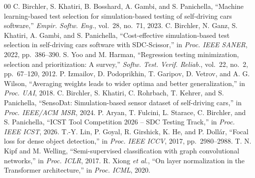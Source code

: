 \documentclass[conference]{IEEEtran}
\begin{document}
{\small
\vspace{-5pt}
\begin{thebibliography}{00}
 C. Birchler, S. Khatiri, B. Bosshard, A. Gambi, and S. Panichella, ``Machine learning-based test selection for simulation-based testing of self-driving cars software,'' \textit{Empir. Softw. Eng.}, vol.~28, no.~71, 2023.
 C. Birchler, N. Ganz, S. Khatiri, A. Gambi, and S. Panichella, ``Cost-effective simulation-based test selection in self-driving cars software with SDC-Scissor,'' in \textit{Proc. IEEE SANER}, 2022, pp.~386--390.
 S. Yoo and M. Harman, ``Regression testing minimization, selection and prioritization: A survey,'' \textit{Softw. Test. Verif. Reliab.}, vol.~22, no.~2, pp.~67--120, 2012.
 P. Izmailov, D. Podoprikhin, T. Garipov, D. Vetrov, and A. G. Wilson, ``Averaging weights leads to wider optima and better generalization,'' in \textit{Proc. UAI}, 2018.
 C. Birchler, S. Khatiri, C. Rohrbach, T. Kehrer, and S. Panichella, ``SensoDat: Simulation-based sensor dataset of self-driving cars,'' in \textit{Proc. IEEE/ACM MSR}, 2024.
 P. Aryan, T. Fulcini, L. Starace, C. Birchler, and S. Panichella, ``ICST Tool Competition 2026 -- SDC Testing Track,'' in \textit{Proc. IEEE ICST}, 2026.
 T.-Y. Lin, P. Goyal, R. Girshick, K. He, and P. Doll\'{a}r, ``Focal loss for dense object detection,'' in \textit{Proc. IEEE ICCV}, 2017, pp.~2980--2988.
 T. N. Kipf and M. Welling, ``Semi-supervised classification with graph convolutional networks,'' in \textit{Proc. ICLR}, 2017.
 R. Xiong \textit{et al.}, ``On layer normalization in the Transformer architecture,'' in \textit{Proc. ICML}, 2020.
\end{thebibliography}}
\end{document}
